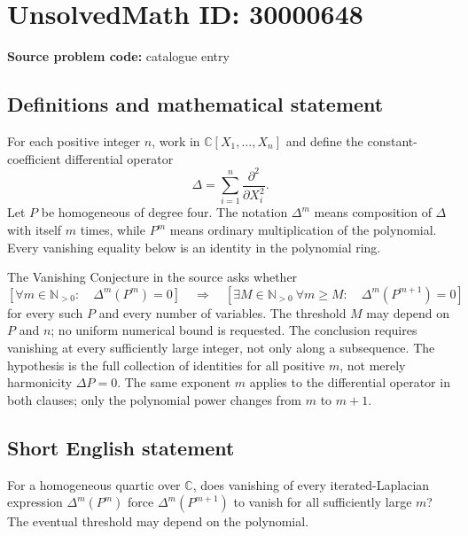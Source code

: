 \documentclass[11pt]{article}
\newcommand{\N}{\mathbb{N}}
\newcommand{\C}{\mathbb{C}}
\begin{document}
\section*{UnsolvedMath ID: 30000648}
\textbf{Source problem code:} catalogue entry
\subsection{Definitions and mathematical statement}
For each positive integer $n$, work in $\C[X_1,\ldots,X_n]$ and define the constant-coefficient differential operator
\[
 \Delta=\sum_{i=1}^n\frac{\partial^2}{\partial X_i^2}.
\]
Let $P$ be homogeneous of degree four. The notation $\Delta^m$ means composition of $\Delta$ with itself $m$ times, while $P^m$ means ordinary multiplication of the polynomial. Every vanishing equality below is an identity in the polynomial ring.

The Vanishing Conjecture in the source asks whether
\[
 \left[\forall m\in\N_{>0}:\quad\Delta^m(P^m)=0\right]
 \quad\Longrightarrow\quad
 \left[\exists M\in\N_{>0}\ \forall m\ge M:\quad
                      \Delta^m(P^{m+1})=0\right]
\]
for every such $P$ and every number of variables. The threshold $M$ may depend on $P$ and $n$; no uniform numerical bound is requested. The conclusion requires vanishing at every sufficiently large integer, not only along a subsequence. The hypothesis is the full collection of identities for all positive $m$, not merely harmonicity $\Delta P=0$. The same exponent $m$ applies to the differential operator in both clauses; only the polynomial power changes from $m$ to $m+1$.
\subsection{Short English statement}
For a homogeneous quartic over $\C$, does vanishing of every iterated-Laplacian expression $\Delta^m(P^m)$ force $\Delta^m(P^{m+1})$ to vanish for all sufficiently large $m$? The eventual threshold may depend on the polynomial.
\end{document}
